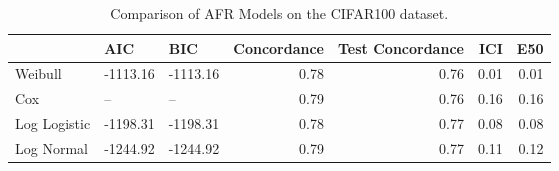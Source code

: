 \begin{table*}
\centering
\caption{Comparison of AFR Models on the CIFAR100 dataset.}
\label{tab:cifar100}
\begin{tabular}{lllrrrr}
\toprule
 & AIC & BIC & Concordance & Test Concordance & ICI & E50 \\
\midrule
Weibull & -1113.16 & -1113.16 & 0.78 & 0.76 & 0.01 & 0.01 \\
Cox & -- & -- & 0.79 & 0.76 & 0.16 & 0.16 \\
Log Logistic & -1198.31 & -1198.31 & 0.78 & 0.77 & 0.08 & 0.08 \\
Log Normal & -1244.92 & -1244.92 & 0.79 & 0.77 & 0.11 & 0.12 \\
\bottomrule
\end{tabular}
\end{table*}
